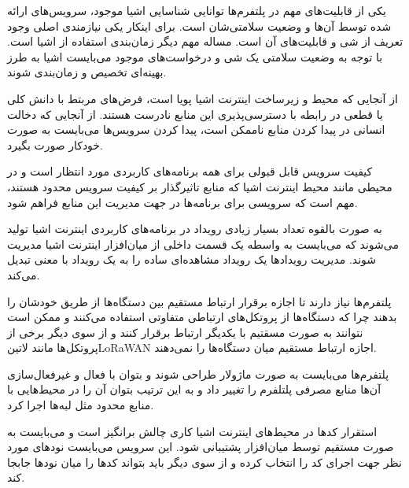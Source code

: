 
یکی از قابلیت‌های مهم در پلتفرم‌ها توانایی شناسایی اشیا موجود، سرویس‌های ارائه شده توسط آن‌ها و وضعیت سلامتی‌شان است.
برای اینکار یکی نیازمندی اصلی وجود تعریف از شی و قابلیت‌های آن است.
مساله مهم دیگر زمان‌بندی استفاده از اشیا است. با توجه به وضعیت سلامتی یک شی و درخواست‌های موجود می‌بایست اشیا
به طرز بهینه‌ای تخصیص و زمان‌بندی شوند.

از آنجایی که محیط و زیرساخت اینترنت اشیا پویا است، فرض‌های مربتط با دانش کلی یا قطعی در رابطه با دسترسی‌پذیری این
منابع نادرست هستند.
از آنجایی که دخالت انسانی در پیدا کردن منابع ناممکن است، پیدا کردن سرویس‌ها می‌بایست به صورت خودکار صورت بگیرد.


کیفیت سرویس قابل قبولی برای همه برنامه‌های کاربردی مورد انتظار است و در محیطی مانند محیط اینترنت اشیا که منابع تاثیرگذار بر کیفیت سرویس
محدود هستند، مهم است که سرویسی برای برنامه‌ها در جهت مدیریت این منابع فراهم شود.


به صورت بالقوه تعداد بسیار زیادی رویداد در برنامه‌های کاربردی اینترنت اشیا تولید می‌شوند
که می‌بایست به واسطه یک قسمت داخلی از میان‌افزار اینترنت اشیا مدیریت شوند.
مدیریت رویدادها یک رویداد مشاهده‌ای ساده را به یک رویداد با معنی تبدیل می‌کند.


پلتفرم‌ها نیاز دارند تا اجازه برقرار ارتباط مستقیم بین دستگاه‌ها از طریق خودشان را بدهند چرا که دستگاه‌ها از پروتکل‌های ارتباطی متفاوتی استفاده می‌کنند
و ممکن است نتوانند به صورت مسقتیم با یکدیگر ارتباط برقرار کنند و از سوی دیگر برخی از پروتکل‌ها مانند ‌لاتین{LoRaWAN} اجازه ارتباط مستقیم میان
دستگاه‌ها را نمی‌دهند.


پلتفرم‌ها می‌بایست به صورت ماژولار طراحی شوند و بتوان با فعال و غیرفعال‌سازی آن‌ها منابع مصرفی پلتلفرم را تغییر داد و به این ترتیب بتوان آن را در محیط‌هایی
با منابع محدود مثل لبه‌ها اجرا کرد.


استقرار کدها در محیط‌های اینترنت اشیا کاری چالش برانگیز است و می‌بایست به صورت مستقیم توسط میان‌افزار پشتیبانی شود.
این سرویس می‌بایست نودهای مورد نظر جهت اجرای کد را انتخاب کرده و از سوی دیگر باید بتواند کدها را میان نودها جابجا کند.
